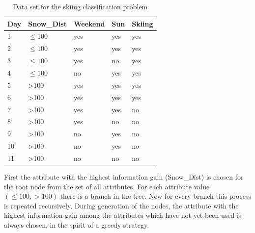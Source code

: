 \documentclass[10pt]{book}
\begin{document}
\begin{table}[t]
\centering
\caption{Data set for the skiing classification problem}
\begin{tabular}{|l|l|l|l|l|}
\hline
Day & Snow\_Dist & Weekend & Sun & Skiing \\
\hline
1 & $\leq 100$ & yes & yes & yes \\
\hline
2 & $\leq 100$ & yes & yes & yes \\
\hline
3 & $\leq 100$ & yes & no & yes \\
\hline
4 & $\leq 100$ & no & yes & yes \\
\hline
5 & >100 & yes & yes & yes \\
\hline
6 & >100 & yes & yes & yes \\
\hline
7 & >100 & yes & yes & no \\
\hline
8 & >100 & yes & no & no \\
\hline
9 & >100 & no & yes & no \\
\hline
10 & >100 & no & yes & no \\
\hline
11 & >100 & no & no & no \\
\hline
\end{tabular}
\end{table}

First the attribute with the highest information gain (Snow\_Dist) is chosen for the root node from the set of all attributes. For each attribute value $(\leq 100, >100)$ there is a branch in the tree. Now for every branch this process is repeated recursively. During generation of the nodes, the attribute with the highest information gain among the attributes which have not yet been used is always chosen, in the spirit of a greedy strategy.
\end{document}
